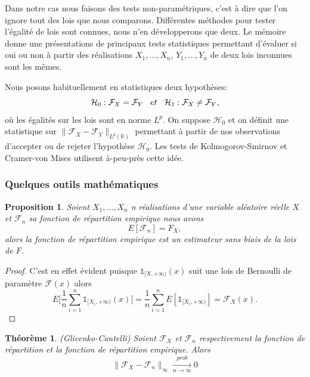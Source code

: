 \documentclass[a4paper,10pt]{article}
\newtheorem{theorem}{Théorème}[section]
\newtheorem{proposition}{Proposition}
\begin{document}
Dans notre cas nous faisons des tests non-paramétriques, c'est à dire que l'on ignore tout des lois que nous comparons.
Différentes méthodes pour tester l'égalité de lois sont connues, nous n'en développerons que deux. Le mémoire \cite{ethier2011propos} donne une présentations de principaux tests statistiques permettant d'évaluer si oui ou non à partir des réalisations $X_1,...,X_n$, $Y_1,...,Y_n$ de deux lois inconnues sont les mêmes. 

Nous posons habituellement en statistiques deux hypothèses:
\[ \mathcal{H}_0: \mathcal{F}_{X} = \mathcal{F}_{Y} \hspace{3mm} et \hspace{3mm} \mathcal{H}_1: \mathcal{F}_{X} \neq \mathcal{F}_{Y},\]
où les égalités sur les lois sont en norme $L^p$. On suppose $\mathcal{H}_0$ et on définit une statistique sur $\|\mathcal{F}_{X}-\mathcal{F}_{Y}\|_{L^p(\mathbb{R})}$ permettant à partir de nos observations d'accepter ou de rejeter l'hypothèse $\mathcal{H}_0$.
Les tests de Kolmogorov-Smirnov et Cramer-von Mises utilisent à-peu-près cette idée. 

\subsubsection{Quelques outils mathématiques}

\begin{proposition}
	\label{mean-rep-emp}
	Soient $X_1,...,X_n$ n réalisations d'une variable aléatoire réelle $X$ et $\mathcal{F}_{n}$ sa fonction de répartition empirique nous avons
	\[E[\mathcal{F}_n]=F_{X},\]
	alors la fonction de répartition empirique est un estimateur sans biais de la lois de $F$. 
\end{proposition}

\begin{proof}
	C'est en effet évident puisque $\mathds{1}_{[X, +\infty )}(x)$ suit une lois de Bernoulli de paramètre $\mathcal{F}(x)$ alors 
	\[E\Big[\frac{1}{n}\sum_{i=1}^{n}\mathds{1}_{[X_i, +\infty )}(x)\Big]= \frac{1}{n}\sum_{i=1}^{n}E[\mathds{1}_{[X_i, +\infty )}]=\mathcal{F}_{X}(x).\]
\end{proof}


\begin{theorem}(Glivenko-Cantelli)
	\label{th-glivenko}
Soient $\mathcal{F}_{X}$ et $\mathcal{F}_{n}$ respectivement la fonction de répartition et la fonction de répartition empirique. Alors 
\begin{equation}
	\|\mathcal{F}_{X}-\mathcal{F}_{n}\|_{\infty} \xrightarrow[n\to \infty]{prob} 0 
\end{equation}
\end{theorem}
\end{document}
